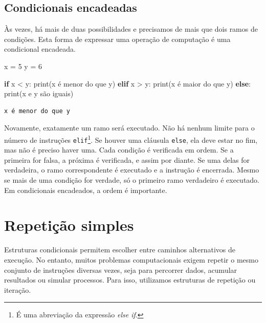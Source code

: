 \documentclass[
  brazilian,
  letterpaper,
  DIV=11,
  numbers=noendperiod]{scrreprt}
\newenvironment{Shaded}{\begin{snugshade}}{\end{snugshade}}
\newcommand{\BuiltInTok}[1]{\textcolor[rgb]{0.00,0.23,0.31}{#1}}
\newcommand{\ControlFlowTok}[1]{\textcolor[rgb]{0.00,0.23,0.31}{\textbf{#1}}}
\newcommand{\DecValTok}[1]{\textcolor[rgb]{0.68,0.00,0.00}{#1}}
\newcommand{\NormalTok}[1]{\textcolor[rgb]{0.00,0.23,0.31}{#1}}
\newcommand{\OperatorTok}[1]{\textcolor[rgb]{0.37,0.37,0.37}{#1}}
\newcommand{\StringTok}[1]{\textcolor[rgb]{0.13,0.47,0.30}{#1}}
\begin{document}
\subsection{Condicionais encadeadas}\label{condicionais-encadeadas}

Às vezes, há mais de duas possibilidades e precisamos de mais que dois
ramos de condições. Esta forma de expressar uma operação de computação é
uma condicional encadeada.

\begin{Shaded}
\begin{Highlighting}[]
\NormalTok{x }\OperatorTok{=} \DecValTok{5}
\NormalTok{y }\OperatorTok{=} \DecValTok{6}

\ControlFlowTok{if}\NormalTok{ x }\OperatorTok{\textless{}}\NormalTok{ y:}
    \BuiltInTok{print}\NormalTok{(}\StringTok{\textquotesingle{}x é menor do que y\textquotesingle{}}\NormalTok{)}
\ControlFlowTok{elif}\NormalTok{ x }\OperatorTok{\textgreater{}}\NormalTok{ y:}
    \BuiltInTok{print}\NormalTok{(}\StringTok{\textquotesingle{}x é maior do que y\textquotesingle{}}\NormalTok{)}
\ControlFlowTok{else}\NormalTok{:}
    \BuiltInTok{print}\NormalTok{(}\StringTok{\textquotesingle{}x e y são iguais\textquotesingle{}}\NormalTok{)}
\end{Highlighting}
\end{Shaded}

\begin{verbatim}
x é menor do que y
\end{verbatim}

Novamente, exatamente um ramo será executado. Não há nenhum limite para
o número de instruções \texttt{elif}\footnote{É uma abreviação da
  expressão \emph{else if}.}. Se houver uma cláusula \texttt{else}, ela
deve estar no fim, mas não é preciso haver uma. Cada condição é
verificada em ordem. Se a primeira for falsa, a próxima é verificada, e
assim por diante. Se uma delas for verdadeira, o ramo correspondente é
executado e a instrução é encerrada. Mesmo se mais de uma condição for
verdade, só o primeiro ramo verdadeiro é executado. Em condicionais
encadeados, a ordem é importante.

\section{Repetição simples}\label{repetiuxe7uxe3o-simples}

Estruturas condicionais permitem escolher entre caminhos alternativos de
execução. No entanto, muitos problemas computacionais exigem repetir o
mesmo conjunto de instruções diversas vezes, seja para percorrer dados,
acumular resultados ou simular processos. Para isso, utilizamos
estruturas de repetição ou iteração.
\end{document}
